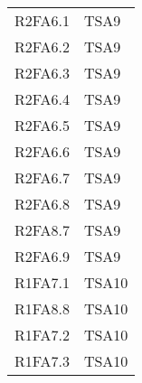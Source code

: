 {\begin{longtable}{C{4cm} C{4cm}}
R2FA6.1 & TSA9  \\
R2FA6.2 & TSA9  \\
R2FA6.3 & TSA9  \\
R2FA6.4 & TSA9  \\
R2FA6.5 & TSA9  \\
R2FA6.6 & TSA9  \\
R2FA6.7 & TSA9  \\
R2FA6.8 & TSA9  \\
R2FA8.7 & TSA9  \\
R2FA6.9 & TSA9  \\

R1FA7.1 & TSA10  \\
R1FA8.8 & TSA10  \\
R1FA7.2 & TSA10  \\
R1FA7.3 & TSA10  \\



\end{longtable}}
